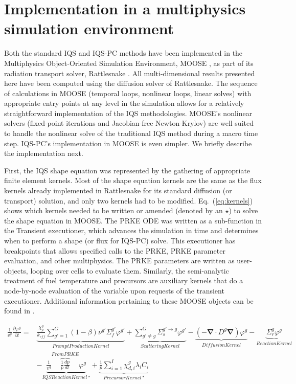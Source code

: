 \documentclass{elsarticle}
\newcommand{\bs}[1]{\mathbf{#1}}
\renewcommand{\div}{\bs{\nabla}\! \cdot \!}
\newcommand{\grad}{\bs{\nabla}}
\newcommand{\eqt}[1]{Eq.~(\ref{#1})}                     %
\newcommand{\keff}{k_\textit{eff}}
\newcommand{\iqspc}{IQS-PC\xspace}
\begin{document}
\section{Implementation in a multiphysics simulation environment}

Both the standard IQS and \iqspc methods have been implemented in the Multiphysics Object-Oriented Simulation Environment, MOOSE \cite{moose}, as part of its radiation transport solver, Rattlesnake \cite{wang2013}. All multi-dimensional results presented here have been computed using the diffusion solver of Rattlesnake. The sequence of 
calculations in MOOSE (temporal loops, nonlinear loops, linear solves) with appropriate entry points at any level in the simulation allows for a relatively straightforward implementation of the IQS methodologies. MOOSE's nonlinear solvers (fixed-point iterations and Jacobian-free Newton-Krylov) are well suited to handle the nonlinear solve of the traditional IQS method during a macro time step. \iqspc's implementation in MOOSE is even simpler. We briefly describe the implementation next. 

First, the IQS shape equation was represented by the gathering of appropriate finite element kernels. Most of the shape equation kernels are the same as the flux kernels already implemented in Rattlesnake for its standard diffusion (or transport) solution, and only two kernels had to be modified. \eqt{eq:kernels} shows which kernels needed to be written or amended (denoted by an $\star$) to solve the shape equation in MOOSE. The PRKE ODE was written as a sub-function in the Transient executioner, which advances the simulation in time and determines when to perform a shape (or flux for \iqspc) solve. This executioner has breakpoints that allows specified calls to the PRKE, PRKE parameter evaluation, and other multiphysics. The PRKE parameters are written as user-objects, looping over cells to evaluate them. Similarly, the semi-analytic treatment of fuel temperature and precursors are auxiliary kernels that do a node-by-node evaluation of the variable upon requests of the transient executioner. Additional information pertaining to these MOOSE objects can be found in \cite{PrinceTR2016}.

\begin{align}
\frac{1}{v^g}\frac{\partial\varphi^g}{\partial t}=&\underbrace{\frac{\chi_p^g}{\keff} \sum_{g'=1}^G (1-\beta) \nu^{g'} \Sigma_f^{g'} \varphi^{g'}}_{Prompt Production Kernel} + \underbrace{\sum_{g'\neq g}^G\Sigma_s^{g'\to g} \varphi^{g'}}_{Scattering Kernel} - \underbrace{\left( -\div D^g \grad \right)\varphi^g}_{Diffusion Kernel} - \underbrace{\Sigma_r^g\varphi^g}_{Reaction Kernel} \nonumber \\
& - \underbrace{\frac{1}{v^g} \boxed{\overbrace{\frac{1}{p}\frac{dp}{dt}}^{From PRKE}}\varphi^g}_{IQS Reaction Kernel\ ^\star}+\underbrace{\frac{1}{p}\sum_{i=1}^I\chi_{d,i}^g\lambda_iC_i}_{Precursor Kernel\ ^\star}
\label{eq:kernels}
\end{align}
\end{document}
